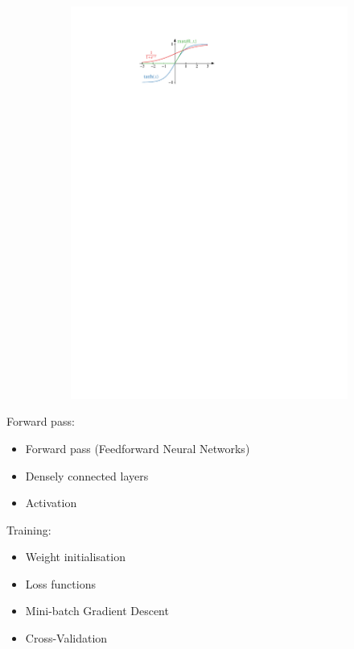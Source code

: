 \begin{figure}[ht]
\begin{subfigure}[t]{0.4\textwidth}
    \centering \includegraphics{./figures/theory/activation_functions.pdf}
    \label{fig:activation_functions}
  \end{subfigure}
\end{figure}

Forward pass:
\begin{itemize}
\item Forward pass (Feedforward Neural Networks)
\item Densely connected layers
\item Activation
\end{itemize}
Training:
\begin{itemize}
\item Weight initialisation
\item Loss functions
\item Mini-batch Gradient Descent
\item Cross-Validation
\end{itemize}

